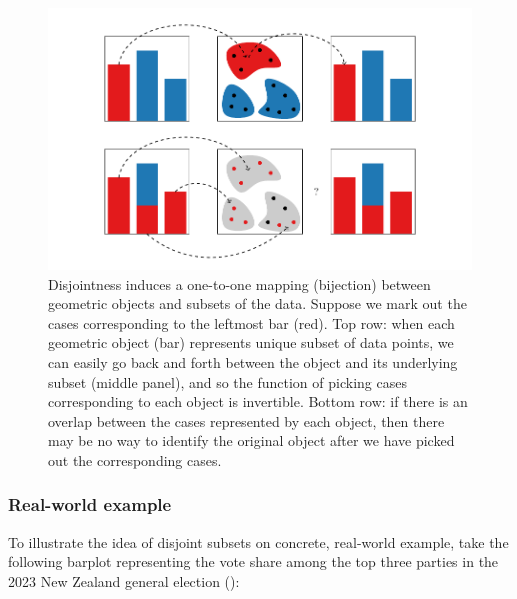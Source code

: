 \documentclass[
]{book}
\theoremstyle{definition}
\theoremstyle{definition}
\theoremstyle{definition}
\theoremstyle{definition}
\theoremstyle{remark}
\begin{document}
\begin{figure}

{\centering \includegraphics[width=1\linewidth,height=1\textheight]{./figures/geoms-bijection} 

}

\caption{Disjointness induces a one-to-one mapping (bijection) between geometric objects and subsets of the data. Suppose we mark out the cases corresponding to the leftmost bar (red). Top row: when each geometric object (bar) represents unique subset of data points, we can easily go back and forth between the object and its underlying subset (middle panel), and so the function of picking cases corresponding to each object is invertible. Bottom row: if there is an overlap between the cases represented by each object, then there may be no way to identify the original object after we have picked out the corresponding cases.}\label{fig:geoms-bijection}
\end{figure}

\subsubsection{Real-world example}\label{real-world-example}

To illustrate the idea of disjoint subsets on concrete, real-world example, take the following barplot representing the vote share among the top three parties in the 2023 New Zealand general election ():
\end{document}

